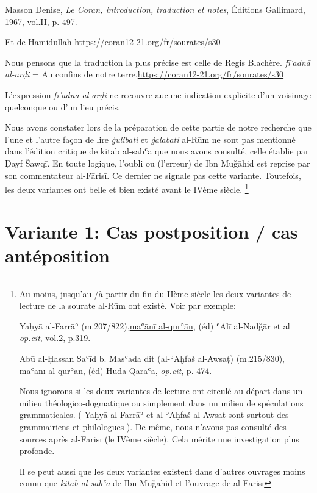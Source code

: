 \documentclass[a4paper,12pt]{report}
\begin{document}
\begin{itemize}
\begin{enumerate}
{Masson Denise,\textit{ Le Coran, introduction, traduction et notes}, Éditions Gallimard, 1967, vol.II, p. 497.  

Et de Hamidullah \url{https://coran12-21.org/fr/sourates/s30} 

Nous pensons que la traduction la plus précise est celle de Regis Blachère. \textit{fī  ͗adnā al-arḍi } = Au confins de notre terre.\url{https://coran12-21.org/fr/sourates/s30}

 L'expression \textit{fī  ͗adnā al-arḍi } ne recouvre  aucune indication  explicite d'un voisinage quelconque ou d'un lieu précis.} 
Nous avons constater lors de la préparation de cette partie de notre recherche que l'une et l'autre  façon de lire\textit{ ġulibati} et \textit{ġalabati} al-Rūm ne sont pas mentionné dans l'édition critique de kitāb al-sabʿa que nous avons consulté, celle établie par Ḍayf Šawq\=i. En toute logique, l'oubli ou (l'erreur) de Ibn Muǧāhid est reprise par son commentateur al-Fāris\=i. Ce dernier ne signale pas cette variante. Toutefois, les deux variantes ont belle et bien existé avant le IVème siècle.   \footnote{ Au moins, jusqu'au /à partir du  fin du IIème siècle les deux variantes de lecture de la sourate al-Rūm ont existé. Voir par exemple:   

Yaḥyā al-Farr\=aʾ (m.207/822),\underline {maʿānī al-qurʾān}, (éd) ʿAlī al-Nadǧār et al \textit{op.cit},  vol.2, p.319.

Abū al-Ḥassan Saʿīd b. Masʿada dit (al-ʾAḫfaš al-Awsaṭ) (m.215/830), \underline{maʿānī al-qurʾān}, (éd) Hudā Qarāʿa, \textit{op.cit}, p. 474.

Nous ignorons si les deux variantes de lecture ont circulé au départ  dans un milieu théologico-dogmatique ou simplement dans un milieu de  spéculations grammaticales.  ( Yaḥyā al-Farr\=aʾ et al-ʾAḫfaš al-Awsaṭ sont surtout des grammairiens et philologues ).  De même, nous n'avons pas consulté des sources après al-F\=aris\=i (le IVème siècle).  Cela mérite une investigation plus profonde. 

Il se peut aussi que les deux variantes existent dans d'autres ouvrages moins connu que\textit{ kitāb al-sabʿa}  de  Ibn Muǧāhid et l'ouvrage de al-F\=aris\=i }



\section{ Variante 1: Cas postposition / cas antéposition}


\end{enumerate}
\end{itemize}
\end{document}
